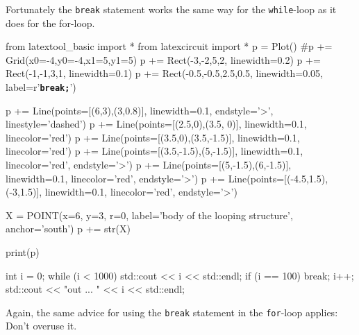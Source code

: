 

\newpage{}

Fortunately the \texttt{break} statement works the same way for the
\texttt{while}-loop as it does for the for-loop.
\begin{python}
from latextool_basic import *
from latexcircuit import *
p = Plot()
#p += Grid(x0=-4,y0=-4,x1=5,y1=5)
p += Rect(-3,-2,5,2, linewidth=0.2)
p += Rect(-1,-1,3,1, linewidth=0.1)
p += Rect(-0.5,-0.5,2.5,0.5, linewidth=0.05, label=r'\texttt{\textbf{break;}}')


p += Line(points=[(6,3),(3,0.8)], linewidth=0.1, endstyle='>', linestyle='dashed')
p += Line(points=[(2.5,0),(3.5, 0)], linewidth=0.1, linecolor='red')
p += Line(points=[(3.5,0),(3.5,-1.5)], linewidth=0.1, linecolor='red')
p += Line(points=[(3.5,-1.5),(5,-1.5)], linewidth=0.1, linecolor='red', endstyle='>')
p += Line(points=[(5,-1.5),(6,-1.5)], linewidth=0.1, linecolor='red', endstyle='>')
p += Line(points=[(-4.5,1.5),(-3,1.5)], linewidth=0.1, linecolor='red', endstyle='>')

X = POINT(x=6, y=3, r=0, label='body of the looping structure', anchor='south')
p += str(X)

print(p)
\end{python}

\begin{console}
int i = 0;
while (i < 1000)
{     
      std::cout << i << std::endl;
      if (i == 100) break;
      i++;
}
std::cout << "out ... " << i << std::endl;
\end{console}

Again, the same advice for using the \texttt{break} statement in the
\texttt{for}-loop applies: Don't overuse it.


\newpage{}

